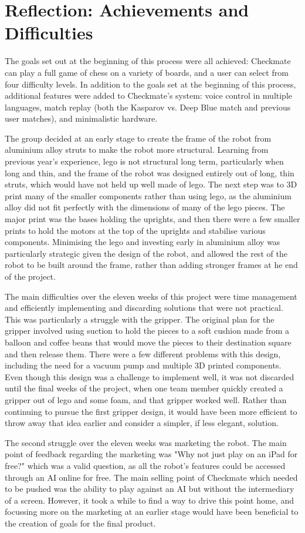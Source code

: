 \documentclass[onecolumn]{IEEEtran}
\begin{document}
\section{Reflection: Achievements and Difficulties}
The goals set out at the beginning of this process were all achieved: Checkmate can play a full game of chess on a variety of boards, and a user can select from four difficulty levels. In addition to the goals set at the beginning of this process, additional features were added to Checkmate's system: voice control in multiple languages, match replay (both the Kasparov vs. Deep Blue match and previous user matches), and minimalistic hardware. \par
The group decided at an early stage to create the frame of the robot from aluminium alloy struts to make the robot more structural. Learning from previous year's experience, lego is not structural long term, particularly when long and thin, and the frame of the robot was designed entirely out of long, thin struts, which would have not held up well made of lego. The next step was to 3D print many of the smaller components rather than using lego, as the aluminium alloy did not fit perfectly with the dimensions of many of the lego pieces. The major print was the bases holding the uprights, and then there were a few smaller prints to hold the motors at the top of the uprights and stabilise various components. Minimising the lego and investing early in aluminium alloy was particularly strategic given the design of the robot, and allowed the rest of the robot to be built around the frame, rather than adding stronger frames at he end of the project. \par
The main difficulties over the eleven weeks of this project were time management and efficiently implementing and discarding solutions that were not practical. This was particularly a struggle with the gripper. The original plan for the gripper involved using suction to hold the pieces to a soft cushion made from a balloon and coffee beans that would move the pieces to their destination square and then release them. There were a few different problems with this design, including the need for a vacuum pump and multiple 3D printed components. Even though this design was a challenge to implement well, it was not discarded until the final weeks of the project, when one team member quickly created a gripper out of lego and some foam, and that gripper worked well. Rather than continuing to pursue the first gripper design, it would have been more efficient to throw away that idea earlier and consider a simpler, if less elegant, solution. \par
The second struggle over the eleven weeks was marketing the robot. The main point of feedback regarding the marketing was "Why not just play on an iPad for free?" which was a valid question, as all the robot's features could be accessed through an AI online for free. The main selling point of Checkmate which needed to be pushed was the ability to play against an AI but without the intermediary of a screen. However, it took a while to find a way to drive this point home, and focussing more on the marketing at an earlier stage would have been beneficial to the creation of goals for the final product. \\
\end{document}
